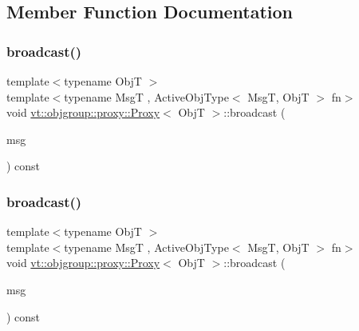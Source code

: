 \subsection{Member Function Documentation}
\mbox{\label{structvt_1_1objgroup_1_1proxy_1_1_proxy_a0b716ca776b1f06e0d7d45afbe9e5274}} 
\subsubsection{\texorpdfstring{broadcast()}{broadcast()}\hspace{0.1cm}{\footnotesize\ttfamily [1/3]}}
{\footnotesize\ttfamily template$<$typename ObjT $>$ \\
template$<$typename MsgT , Active\+Obj\+Type$<$ Msg\+T, Obj\+T $>$ fn$>$ \\
void \hyperlink{structvt_1_1objgroup_1_1proxy_1_1_proxy}{vt\+::objgroup\+::proxy\+::\+Proxy}$<$ ObjT $>$\+::broadcast (\begin{DoxyParamCaption}\item[{MsgT $\ast$}]{msg }\end{DoxyParamCaption}) const}

\mbox{\label{structvt_1_1objgroup_1_1proxy_1_1_proxy_ad3841e2db7085583868956d97c537ffc}} 
\subsubsection{\texorpdfstring{broadcast()}{broadcast()}\hspace{0.1cm}{\footnotesize\ttfamily [2/3]}}
{\footnotesize\ttfamily template$<$typename ObjT $>$ \\
template$<$typename MsgT , Active\+Obj\+Type$<$ Msg\+T, Obj\+T $>$ fn$>$ \\
void \hyperlink{structvt_1_1objgroup_1_1proxy_1_1_proxy}{vt\+::objgroup\+::proxy\+::\+Proxy}$<$ ObjT $>$\+::broadcast (\begin{DoxyParamCaption}\item[{\hyperlink{namespacevt_ab2b3d506ec8e8d1540aede826d84a239}{Msg\+Shared\+Ptr}$<$ MsgT $>$}]{msg }\end{DoxyParamCaption}) const}


